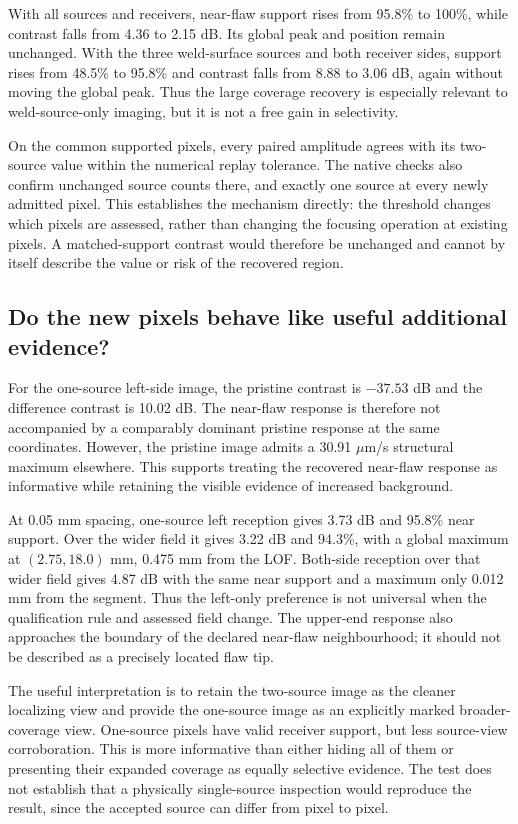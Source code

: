 \documentclass[11pt]{article}
\begin{document}
With all sources and receivers, near-flaw support rises from 95.8\% to 100\%, while contrast falls from 4.36 to 2.15 dB. Its global peak and position remain unchanged. With the three weld-surface sources and both receiver sides, support rises from 48.5\% to 95.8\% and contrast falls from 8.88 to 3.06 dB, again without moving the global peak. Thus the large coverage recovery is especially relevant to weld-source-only imaging, but it is not a free gain in selectivity.

On the common supported pixels, every paired amplitude agrees with its two-source value within the numerical replay tolerance. The native checks also confirm unchanged source counts there, and exactly one source at every newly admitted pixel. This establishes the mechanism directly: the threshold changes which pixels are assessed, rather than changing the focusing operation at existing pixels. A matched-support contrast would therefore be unchanged and cannot by itself describe the value or risk of the recovered region.

\subsection{Do the new pixels behave like useful additional evidence?}
For the one-source left-side image, the pristine contrast is $-37.53$ dB and the difference contrast is 10.02 dB. The near-flaw response is therefore not accompanied by a comparably dominant pristine response at the same coordinates. However, the pristine image admits a 30.91 $\mu$m/s structural maximum elsewhere. This supports treating the recovered near-flaw response as informative while retaining the visible evidence of increased background.

At 0.05 mm spacing, one-source left reception gives 3.73 dB and 95.8\% near support. Over the wider field it gives 3.22 dB and 94.3\%, with a global maximum at $(2.75,18.0)$ mm, 0.475 mm from the LOF. Both-side reception over that wider field gives 4.87 dB with the same near support and a maximum only 0.012 mm from the segment. Thus the left-only preference is not universal when the qualification rule and assessed field change. The upper-end response also approaches the boundary of the declared near-flaw neighbourhood; it should not be described as a precisely located flaw tip.

The useful interpretation is to retain the two-source image as the cleaner localizing view and provide the one-source image as an explicitly marked broader-coverage view. One-source pixels have valid receiver support, but less source-view corroboration. This is more informative than either hiding all of them or presenting their expanded coverage as equally selective evidence. The test does not establish that a physically single-source inspection would reproduce the result, since the accepted source can differ from pixel to pixel.
\end{document}
